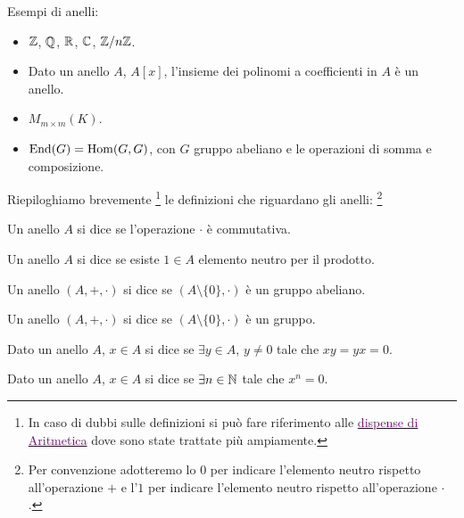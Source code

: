 \documentclass[11pt]{scrartcl}
\begin{document}
\begin{example}[Anelli]
    Esempi di anelli:
    \begin{itemize}
        \item $\mathbb Z$, $\mathbb Q$, $\mathbb R$, $\mathbb C$, ${\mathbb Z}/n{\mathbb Z}$.
        \item Dato un anello $A$, $A[x]$, l'insieme dei polinomi a coefficienti in $A$ è un anello.
        \item $M_{m \times m}(K)$.
        \item $\operatorname{End}(G) = \operatorname{Hom}(G,G)$, con $G$ gruppo abeliano e le operazioni di somma e composizione. 
    \end{itemize}
\end{example}

Riepiloghiamo brevemente \footnote{In caso di dubbi sulle definizioni si può fare riferimento alle \href{https://github.com/diego-unipi/Appunti-Aritmetica}{\textcolor{purple}{dispense di Aritmetica}}
dove sono state trattate più ampiamente.} le definizioni che riguardano gli anelli: \footnote{Per convenzione adotteremo lo $0$ per indicare l'elemento neutro rispetto all'operazione $+$ e l'$1$ per indicare l'elemento neutro rispetto all'operazione $\cdot$.}

\begin{definition}
    Un anello $A$ si dice  se l'operazione $\cdot$ è commutativa.
\end{definition}

\begin{definition}
    Un anello $A$ si dice  se esiste $1 \in A$ elemento neutro per il prodotto.
\end{definition}

\begin{definition}
    Un anello $(A,+,\cdot)$ si dice  se $(A\setminus\{0\},\cdot)$ è un gruppo abeliano.
\end{definition}

\begin{definition}
    Un anello $(A,+,\cdot)$ si dice  se $(A\setminus\{0\},\cdot)$ è un gruppo.
\end{definition}

\begin{definition}
    Dato un anello $A$, $x \in A$ si dice  se $\exists y \in A$, $y \ne 0$ tale che $xy=yx=0$.
\end{definition}

\begin{definition}
    Dato un anello $A$, $x \in A$ si dice  se $\exists n \in \mathbb N$ tale che $x^n = 0$.
\end{definition}
\end{document}
